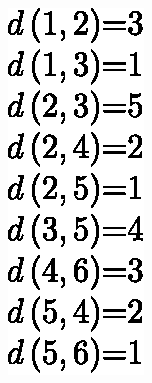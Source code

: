 \begin{figure}[!htbp]
\begin{subfigure}[b]{0.09\textwidth}
		\includegraphics[width=\textwidth]{Chapter_I/2/1_2b.eps}

\end{subfigure}
\end{figure}
